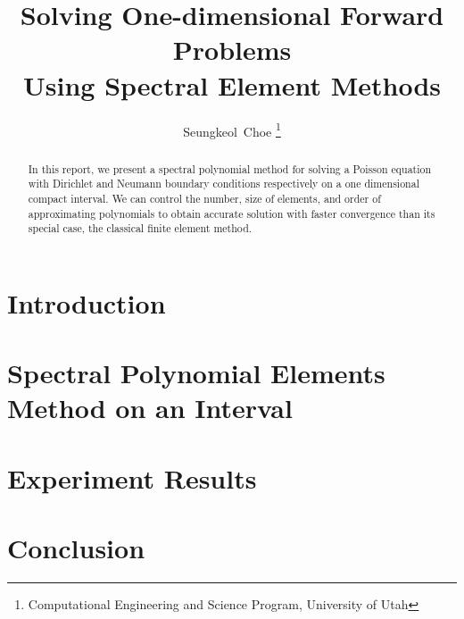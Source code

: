 \documentclass[11pt, notitlepage,  letterpaper]{article}
\begin{document}
\title{
{Solving One-dimensional Forward Problems }\\{Using Spectral Element Methods}}

\vfill
\author{Seungkeol\ Choe \thanks{Computational Engineering and Science Program, University of Utah}}

\renewcommand{\today}{Jan 7th, 2004}

\maketitle

\begin{abstract}
In this report, we present a spectral polynomial method for solving a Poisson equation with Dirichlet and Neumann boundary conditions respectively on a one dimensional compact interval.
We can control the number, size of elements, and order of approximating polynomials to obtain accurate solution with faster convergence than its special case, the classical finite element method.
\end{abstract}


\tableofcontents

\clearpage

\section{Introduction}



\section{Spectral Polynomial Elements Method on an Interval}


\section{Experiment Results}



\section{Conclusion}





%
\end{document}
